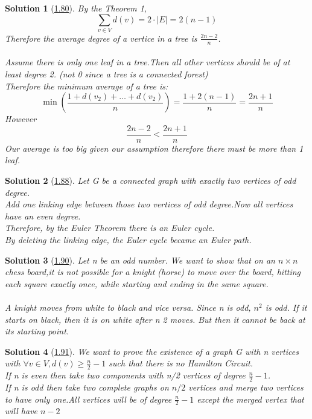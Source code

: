 \documentclass[10pt]{report}
\numberwithin{dummy}{section}
\theoremstyle{ocrenumbox}
\newtheorem{definitionTT}{Solution}[]
\theoremstyle{grayman}
\newenvironment{sol}{\begin{sBox}\begin{definitionTT}}{\end{definitionTT}\end{sBox}}
\begin{document}
\begin{sol}[\hypertarget{so180}{\hyperlink{exo180}{1.80}}]
By the Theorem 1,
\[\sum_{v\in V} d(v) = 2\cdot\lvert E \rvert = 2(n-1) \]
Therefore the average degree of a vertice in a tree is $\frac{2n-2}{n}$.\\ \\
Assume there is only one leaf in a tree.Then all other vertices should be of at least degree 2. (not 0 since a tree is a connected forest)\\ 
Therefore the minimum average of a tree is:
\[\min\left( \frac{1+d(v_2)+\dots+d(v_2)}{n}\right)=\frac{1+2(n-1)}{n} = \frac{2n +1}{n}\]
However 
\[\frac{2n-2}{n} <\frac{2n +1}{n} \]
Our average is too big given our assumption therefore there must be more than 1 leaf.

\end{sol}
\begin{sol}[\hypertarget{so188}{\hyperlink{exo188}{1.88}}]
Let G be a connected graph with exactly two vertices of odd
degree.\\
Add one linking edge between those two vertices of odd degree.Now all vertices have an even degree.\\
Therefore, by the Euler Theorem there is an Euler cycle.\\
By deleting the linking edge, the Euler cycle became an Euler path.\\
\end{sol}
\begin{sol}[\hypertarget{so190}{\hyperlink{exo190}{1.90}}]
Let n be an odd number. We want to show that on an $n \times n$ chess board,it is not possible for a knight (horse) to move over the board, hitting each square exactly once, while starting and ending in the same square.\\ \\
A knight moves from white to black and vice versa. Since n is
odd, $n^2$ is odd. If it starts on black, then it is on
white after n 2 moves. But then it cannot be back at its starting point.
\end{sol}
\begin{sol}[\hypertarget{so191}{\hyperlink{exo191}{1.91}}]
We want to prove the existence of a graph G  with n vertices with $\forall v \in V, d(v) \ge \frac{n}{2}-1$ such that there is no Hamilton Circuit.\\
If n is even then take two components with n/2 vertices of degree $\frac{n}{2}-1$.\\
If n is odd then take two complete graphs on $n/2$ vertices and merge two vertices to have only one.All vertices will be of degree  $\frac{n}{2}-1$ except the merged vertex that will have $n-2$

\end{sol}
\end{document}
